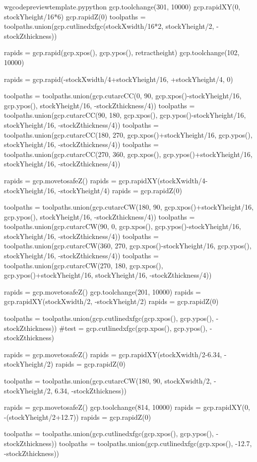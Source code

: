 \documentclass{ltxdoc}
\begin{document}
\begin{writecode}{w}{gcodepreviewtemplate.py}{python}
gcp.toolchange(301, 10000)
gcp.rapidXY(0, stockYheight/16*6)
gcp.rapidZ(0)
toolpaths = toolpaths.union(gcp.cutlinedxfgc(stockXwidth/16*2, stockYheight/2, -stockZthickness))

rapids = gcp.rapid(gcp.xpos(), gcp.ypos(), retractheight)
gcp.toolchange(102, 10000)

rapids = gcp.rapid(-stockXwidth/4+stockYheight/16, +stockYheight/4, 0)

toolpaths = toolpaths.union(gcp.cutarcCC(0, 90, gcp.xpos()-stockYheight/16, gcp.ypos(), stockYheight/16, -stockZthickness/4))
toolpaths = toolpaths.union(gcp.cutarcCC(90, 180, gcp.xpos(), gcp.ypos()-stockYheight/16, stockYheight/16, -stockZthickness/4))
toolpaths = toolpaths.union(gcp.cutarcCC(180, 270, gcp.xpos()+stockYheight/16, gcp.ypos(), stockYheight/16, -stockZthickness/4))
toolpaths = toolpaths.union(gcp.cutarcCC(270, 360, gcp.xpos(), gcp.ypos()+stockYheight/16, stockYheight/16, -stockZthickness/4))

rapids = gcp.movetosafeZ()
rapids = gcp.rapidXY(stockXwidth/4-stockYheight/16, -stockYheight/4)
rapids = gcp.rapidZ(0)

toolpaths = toolpaths.union(gcp.cutarcCW(180, 90, gcp.xpos()+stockYheight/16, gcp.ypos(), stockYheight/16, -stockZthickness/4))
toolpaths = toolpaths.union(gcp.cutarcCW(90, 0, gcp.xpos(), gcp.ypos()-stockYheight/16, stockYheight/16, -stockZthickness/4))
toolpaths = toolpaths.union(gcp.cutarcCW(360, 270, gcp.xpos()-stockYheight/16, gcp.ypos(), stockYheight/16, -stockZthickness/4))
toolpaths = toolpaths.union(gcp.cutarcCW(270, 180, gcp.xpos(), gcp.ypos()+stockYheight/16, stockYheight/16, -stockZthickness/4))

rapids = gcp.movetosafeZ()
gcp.toolchange(201, 10000)
rapids = gcp.rapidXY(stockXwidth/2, -stockYheight/2)
rapids = gcp.rapidZ(0)

toolpaths = toolpaths.union(gcp.cutlinedxfgc(gcp.xpos(), gcp.ypos(), -stockZthickness))
#test = gcp.cutlinedxfgc(gcp.xpos(), gcp.ypos(), -stockZthickness)

rapids = gcp.movetosafeZ()
rapids = gcp.rapidXY(stockXwidth/2-6.34, -stockYheight/2)
rapids = gcp.rapidZ(0)

toolpaths = toolpaths.union(gcp.cutarcCW(180, 90, stockXwidth/2, -stockYheight/2, 6.34, -stockZthickness))

rapids = gcp.movetosafeZ()
gcp.toolchange(814, 10000)
rapids = gcp.rapidXY(0, -(stockYheight/2+12.7))
rapids = gcp.rapidZ(0)

toolpaths = toolpaths.union(gcp.cutlinedxfgc(gcp.xpos(), gcp.ypos(), -stockZthickness))
toolpaths = toolpaths.union(gcp.cutlinedxfgc(gcp.xpos(), -12.7, -stockZthickness))


\end{writecode}
\end{document}
